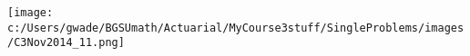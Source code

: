 
\texttt{[image: c:/Users/gwade/BGSUmath/Actuarial/MyCourse3stuff/SingleProblems/images/C3Nov2014\_11.png]}

\showsol{\bsoln

\esoln}

